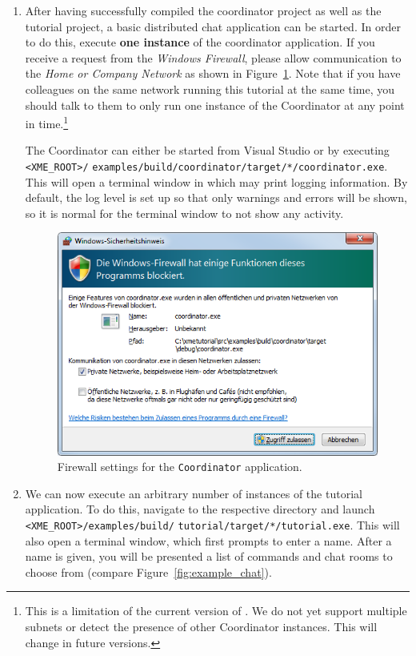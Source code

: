 \begin{enumerate}
	\item After having successfully compiled the coordinator project as well as the tutorial project,
		a basic distributed chat application can be started.
		In order to do this, execute {\bf one instance} of the coordinator application.
		If you receive a request from the \emph{Windows Firewall},
		please allow communication to the \emph{Home or Company Network} as shown in Figure~\ref{fig:firewall_coordinator}.
		Note that if you have colleagues on the same network running this tutorial at the same time,
		you should talk to them to only run one instance of the Coordinator at any point in time.\footnote{%
			This is a limitation of the current version of \xme. We do not yet support multiple subnets
			or detect the presence of other Coordinator instances. This will change in future versions.}
		
		The Coordinator can either be started from Visual Studio or by executing \verb|<XME_ROOT>/|
		\verb|examples/build/coordinator/target/*/coordinator.exe|.
		This will open a terminal window in which \xme may print logging information.
		By default, the log level is set up so that only warnings and errors will be shown,
		so it is normal for the terminal window to not show any activity.

\begin{figure}[htpb]
	\centering
	\includegraphics[scale=0.75]{figures/PNG/firewall_coordinator.png}
	\caption{Firewall settings for the \texttt{Coordinator} application.}
	\label{fig:firewall_coordinator}
\end{figure}

	\item We can now execute an arbitrary number of instances of the tutorial application.
		To do this, navigate to the respective directory and launch
		\verb|<XME_ROOT>/examples/build/| \verb|tutorial/target/*/tutorial.exe|.
		This will also open a terminal window, which first prompts to enter a name.
		After a name is given, you will be presented a list of commands and chat rooms to choose from
		(compare Figure~\ref{fig:example_chat}).


\end{enumerate}
